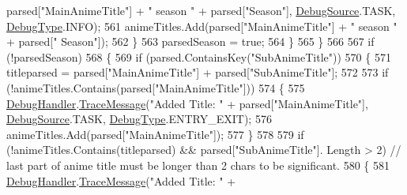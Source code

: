 \begin{DoxyCode}
       parsed[\textcolor{stringliteral}{"MainAnimeTitle"}] + \textcolor{stringliteral}{" season "} + parsed[\textcolor{stringliteral}{"Season"}], \mbox{\hyperlink{namespace_little_weeb_library_1_1_handlers_a2a6ca0775121c9c503d58aa254d292be}{DebugSource}}.TASK, 
      \mbox{\hyperlink{namespace_little_weeb_library_1_1_handlers_ab66019ed40462876ec4e61bb3ccb0a62}{DebugType}}.INFO);
561                                         animeTitles.Add(parsed[\textcolor{stringliteral}{"MainAnimeTitle"}] + \textcolor{stringliteral}{" season "} + parsed[\textcolor{stringliteral}{"
      Season"}]);
562                                     \}
563                                     parsedSeason = \textcolor{keyword}{true};
564                                 \}
565                             \}
566 
567                             \textcolor{keywordflow}{if} (!parsedSeason)
568                             \{
569                                 \textcolor{keywordflow}{if} (parsed.ContainsKey(\textcolor{stringliteral}{"SubAnimeTitle"}))
570                                 \{
571                                     titleparsed = parsed[\textcolor{stringliteral}{"MainAnimeTitle"}] + parsed[\textcolor{stringliteral}{"SubAnimeTitle"}];
572 
573                                     \textcolor{keywordflow}{if} (!animeTitles.Contains(parsed[\textcolor{stringliteral}{"MainAnimeTitle"}]))
574                                     \{
575                                         \mbox{\hyperlink{class_little_weeb_library_1_1_handlers_1_1_anime_profile_handler_a0b0ae3c3838d26351485e6dfc566a632}{DebugHandler}}.\mbox{\hyperlink{interface_little_weeb_library_1_1_handlers_1_1_i_debug_handler_a2e405bc3492e683cd3702fae125221bc}{TraceMessage}}(\textcolor{stringliteral}{"Added Title: "} +
       parsed[\textcolor{stringliteral}{"MainAnimeTitle"}], \mbox{\hyperlink{namespace_little_weeb_library_1_1_handlers_a2a6ca0775121c9c503d58aa254d292be}{DebugSource}}.TASK, \mbox{\hyperlink{namespace_little_weeb_library_1_1_handlers_ab66019ed40462876ec4e61bb3ccb0a62}{DebugType}}.ENTRY\_EXIT);
576                                         animeTitles.Add(parsed[\textcolor{stringliteral}{"MainAnimeTitle"}]);
577                                     \}
578 
579                                     \textcolor{keywordflow}{if} (!animeTitles.Contains(titleparsed) && parsed[\textcolor{stringliteral}{"SubAnimeTitle"}].
      Length > 2) \textcolor{comment}{// last part of anime title must be longer than 2 chars to be significant.}
580                                     \{
581                                         \mbox{\hyperlink{class_little_weeb_library_1_1_handlers_1_1_anime_profile_handler_a0b0ae3c3838d26351485e6dfc566a632}{DebugHandler}}.\mbox{\hyperlink{interface_little_weeb_library_1_1_handlers_1_1_i_debug_handler_a2e405bc3492e683cd3702fae125221bc}{TraceMessage}}(\textcolor{stringliteral}{"Added Title: "} +

\end{DoxyCode}

